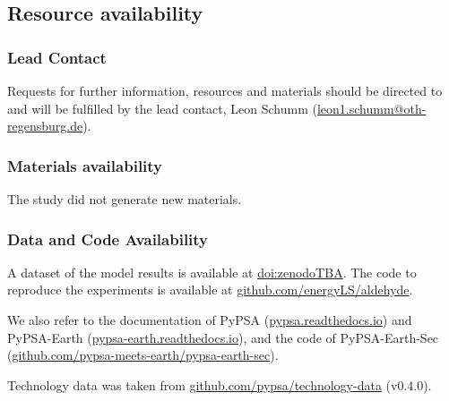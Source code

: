 

\subsection*{Resource availability}

\subsubsection*{Lead Contact}

Requests for further information, resources and materials should be directed to and will be fulfilled by the lead contact, Leon Schumm
(\href{mailto:leon1.schumm@oth-regensburg.de}{leon1.schumm@oth-regensburg.de}).

\subsubsection*{Materials availability}
The study did not generate new materials.



\subsubsection*{Data and Code Availability}

A dataset of the model results is available at \href{zenodoTBA}{doi:zenodoTBA}.
The code to reproduce the experiments is available at \href{https://github.com/energyLS/aldehyde}{github.com/energyLS/aldehyde}.

We also refer to the documentation of PyPSA
(\href{https://pypsa.readthedocs.io}{pypsa.readthedocs.io}) and PyPSA-Earth (\href{https://pypsa-earth.readthedocs.io}{pypsa-earth.readthedocs.io}), and the code of PyPSA-Earth-Sec
(\href{https://github.com/pypsa-meets-earth/pypsa-earth-sec}{github.com/pypsa-meets-earth/pypsa-earth-sec}).

Technology data was taken from
\href{https://github.com/pypsa/technology-data}{github.com/pypsa/technology-data} (v0.4.0).




